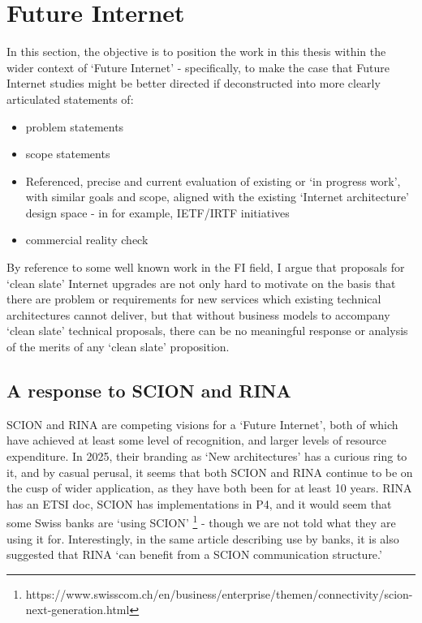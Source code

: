 

\section{Future Internet}
In this section, the objective is to position the work in this thesis within the wider context of `Future Internet' - specifically, to make the case that Future Internet studies might be better directed if deconstructed into more clearly articulated statements of:
\begin{itemize}
	\item problem statements
	\item scope statements
	\item Referenced, precise and current evaluation of existing or `in progress work', with similar goals and scope, aligned with the existing `Internet architecture' design space - in for example, IETF/IRTF initiatives
	\item commercial reality check
	
\end{itemize}

By reference to some well known work in the FI field, I argue that proposals for `clean slate' Internet upgrades are not only hard to motivate on the basis that there are problem or requirements for new services which existing technical architectures cannot deliver, but that without business models to accompany `clean slate' technical proposals, there can be no meaningful response or analysis of the merits of any `clean slate' proposition.

\subsection{A response to SCION and RINA}

SCION\cite{zhang2011} \cite{scion-book} and RINA \cite{day2008} are competing visions for a `Future Internet', both of which have achieved at least some level of recognition, and larger levels of resource expenditure.
In 2025, their branding as `New architectures' has a curious ring to it, and by casual perusal, it seems that both SCION and RINA continue to be on the cusp of wider application, as they have both been for at least 10 years.
RINA has an ETSI doc, SCION has implementations in P4, and it would seem that some Swiss banks are `using SCION' \footnote{https://www.swisscom.ch/en/business/enterprise/themen/connectivity/scion-next-generation.html} - though we are not told what they are using it for.  Interestingly, in the same article describing use by banks, it is also suggested that RINA `can benefit from a SCION communication structure.'

